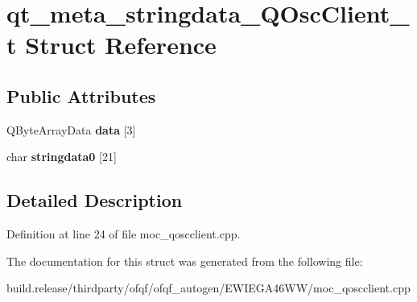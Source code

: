 \hypertarget{structqt__meta__stringdata___q_osc_client__t}{}\section{qt\+\_\+meta\+\_\+stringdata\+\_\+\+Q\+Osc\+Client\+\_\+t Struct Reference}
\label{structqt__meta__stringdata___q_osc_client__t}
\subsection*{Public Attributes}
\begin{DoxyCompactItemize}
\item 
\mbox{\label{structqt__meta__stringdata___q_osc_client__t_aa81643f57eee9d219badba435999cdf8}} 
Q\+Byte\+Array\+Data {\bfseries data} \mbox{[}3\mbox{]}
\item 
\mbox{\label{structqt__meta__stringdata___q_osc_client__t_a7edff3fd092224f55fd8dc5d764ed0d7}} 
char {\bfseries stringdata0} \mbox{[}21\mbox{]}
\end{DoxyCompactItemize}


\subsection{Detailed Description}


Definition at line 24 of file moc\+\_\+qoscclient.\+cpp.



The documentation for this struct was generated from the following file\+:\begin{DoxyCompactItemize}
\item 
build.\+release/thirdparty/ofqf/ofqf\+\_\+autogen/\+E\+W\+I\+E\+G\+A46\+W\+W/moc\+\_\+qoscclient.\+cpp\end{DoxyCompactItemize}
